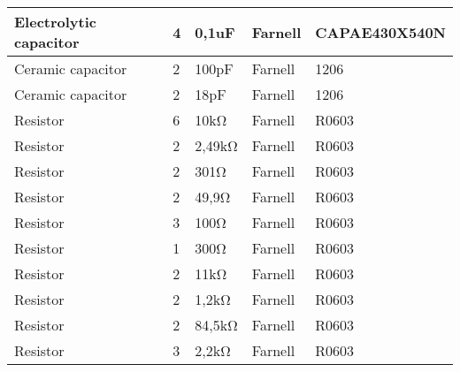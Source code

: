 \begin{center}
\begin{tabularx}{\textwidth}{|X|l|l|l|l|}
    Electrolytic capacitor & 4 & 0,1uF & Farnell & CAPAE430X540N \\ \hline
    Ceramic capacitor & 2 & 100pF & Farnell & 1206 \\ \hline
   Ceramic capacitor & 2 & 18pF & Farnell & 1206 \\ \hline
    Resistor & 6 & 10kΩ & Farnell & R0603\\ \hline
    Resistor & 2 & 2,49kΩ & Farnell & R0603 \\ \hline
    Resistor & 2 & 301Ω & Farnell & R0603 \\ \hline
    Resistor & 2 & 49,9Ω & Farnell & R0603 \\ \hline
    Resistor & 3 & 100Ω & Farnell & R0603 \\ \hline
    Resistor & 1 & 300Ω & Farnell & R0603 \\ \hline
    Resistor & 2 & 11kΩ & Farnell & R0603 \\ \hline
    Resistor & 2 & 1,2kΩ  & Farnell & R0603 \\ \hline
    Resistor & 2 & 84,5kΩ & Farnell & R0603 \\ \hline
    Resistor & 3 & 2,2kΩ & Farnell & R0603 \\ \hline
	\end{tabularx}
\end{center}


